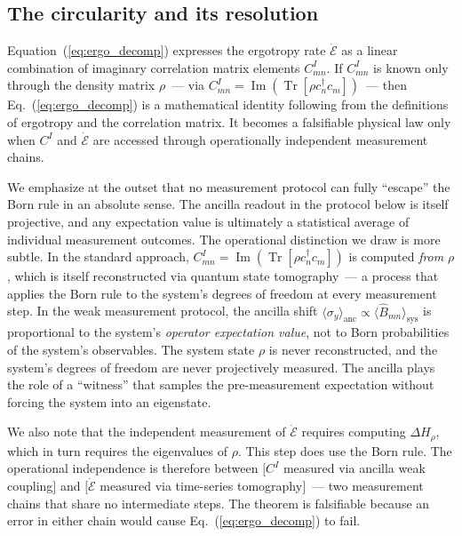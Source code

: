 \documentclass[aps,pra,preprint,groupedaddress,amsmath,amssymb,floatfix]{revtex4-2}
\begin{document}
\subsection{The circularity and its resolution}
\label{sec:circularity}

Equation~(\ref{eq:ergo_decomp}) expresses the ergotropy rate $\dot{\mathcal{E}}$ as a linear combination of imaginary correlation matrix elements $C^I_{mn}$. If $C^I_{mn}$ is known only through the density matrix $\rho$~--- via $C^I_{mn} = \operatorname{Im}(\operatorname{Tr}[\rho c^\dagger_n c_m])$~--- then Eq.~(\ref{eq:ergo_decomp}) is a mathematical identity following from the definitions of ergotropy and the correlation matrix. It becomes a falsifiable physical law only when $C^I$ and $\dot{\mathcal{E}}$ are accessed through operationally independent measurement chains.

We emphasize at the outset that no measurement protocol can fully ``escape'' the Born rule in an absolute sense. The ancilla readout in the protocol below is itself projective, and any expectation value is ultimately a statistical average of individual measurement outcomes. The operational distinction we draw is more subtle. In the standard approach, $C^I_{mn} = \operatorname{Im}(\operatorname{Tr}[\rho c^\dagger_n c_m])$ is computed \textit{from} $\rho$, which is itself reconstructed via quantum state tomography~--- a process that applies the Born rule to the system's degrees of freedom at every measurement step. In the weak measurement protocol, the ancilla shift $\langle \sigma_y \rangle_{\text{anc}} \propto \langle \hat{B}_{mn} \rangle_{\text{sys}}$ is proportional to the system's \textit{operator expectation value}, not to Born probabilities of the system's observables. The system state $\rho$ is never reconstructed, and the system's degrees of freedom are never projectively measured. The ancilla plays the role of a ``witness'' that samples the pre-measurement expectation without forcing the system into an eigenstate.

We also note that the independent measurement of $\dot{\mathcal{E}}$ requires computing $\Delta H_\rho$, which in turn requires the eigenvalues of $\rho$. This step does use the Born rule. The operational independence is therefore between $[C^I$ measured via ancilla weak coupling$]$ and $[\dot{\mathcal{E}}$ measured via time-series tomography$]$~--- two measurement chains that share no intermediate steps. The theorem is falsifiable because an error in either chain would cause Eq.~(\ref{eq:ergo_decomp}) to fail.
\end{document}

